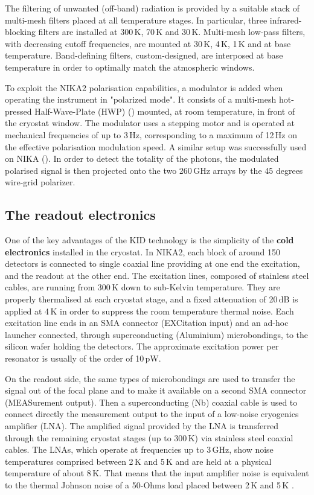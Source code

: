 \documentclass[]{aa} %
\begin{document}
The filtering of unwanted (off-band) radiation is provided by a suitable stack of multi-mesh filters placed at all temperature stages. In particular, three infrared-blocking filters are installed at 300\,K, 70\,K and 30\,K. Multi-mesh low-pass filters, with decreasing cutoff frequencies, are mounted at 30\,K, 4\,K, 1\,K and at base temperature. Band-defining filters, custom-designed, are interposed at base temperature in order to optimally match the atmospheric windows. 

To exploit the NIKA2 polarisation capabilities, a modulator is added when operating the instrument in "polarized mode". It consists of a multi-mesh hot-pressed Half-Wave-Plate (HWP) (\cite{Pisano2016}) mounted, at room temperature, in front of the cryostat window. The modulator uses a stepping motor and is operated at mechanical frequencies of up to 3\,Hz, corresponding to a maximum of 12\,Hz on the effective polarisation modulation speed. A similar setup was successfully used on NIKA (\cite{ritacco2017}). In order to detect the totality of the photons, the modulated polarised signal is then projected onto the two 260\,GHz arrays by the 45 degrees wire-grid polarizer.  


 \subsection{The readout electronics}

One of the key advantages of the KID technology is the simplicity of the {\bf{cold electronics}} installed in the cryostat.
In NIKA2, each block of around 150 detectors is connected to single coaxial line providing at one end the excitation, and the readout at the other end. The excitation lines, composed of stainless steel cables, are running from 300\,K down to sub-Kelvin temperature. They are properly thermalised at each cryostat stage, and a fixed attenuation of 20\,dB is applied at 4\,K in order to suppress the room temperature thermal noise. Each excitation line ends in an SMA connector (EXCitation input) and an ad-hoc launcher connected, through superconducting (Aluminium) microbondings, to the silicon wafer holding the detectors. The approximate excitation power per resonator is usually of the order of 10\,pW.

On the readout side, the same types of microbondings are used to transfer the signal out of the focal plane and to make it available on a second SMA connector (MEASurement output). Then a superconducting (Nb) coaxial cable is used to connect directly the measurement output to the input of a low-noise cryogenics amplifier (LNA). The amplified signal provided by the LNA is transferred through the remaining cryostat stages (up to 300\,K) via stainless steel coaxial cables. The LNAs, which operate at frequencies up to 3\,GHz, show noise temperatures comprised between 2\,K and 5\,K and are held at a physical temperature of about 8\,K. That means that the input amplifier noise is equivalent to the thermal Johnson noise of a 50-Ohms load placed between 2\,K and 5\,K .
\end{document}
